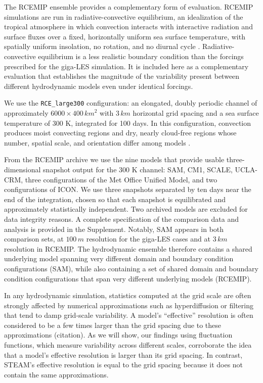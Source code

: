 \documentclass[acp, manuscript, english]{copernicus}
\begin{document}
The RCEMIP ensemble provides a complementary form of evaluation. RCEMIP simulations are run in radiative-convective equilibrium, an idealization of the tropical atmosphere in which convection interacts with interactive radiation and surface fluxes over a fixed, horizontally uniform sea surface temperature, with spatially uniform insolation, no rotation, and no diurnal cycle \citep{wing2018}. Radiative-convective equilibrium is a less realistic boundary condition than the forcings prescribed for the giga-LES simulation. It is included here as a complementary evaluation that establishes the magnitude of the variability present between different hydrodynamic models even under identical forcings. 

We use the \texttt{RCE\_large300} configuration: an elongated, doubly periodic channel of approximately $6000\times400\,\unit{km}^2$ with $3\,\unit{km}$ horizontal grid spacing and a sea surface temperature of 300 K, integrated for 100 days. In this configuration, convection produces moist convecting regions and dry, nearly cloud-free regions whose number, spatial scale, and orientation differ among models \citep{wing2020}. 

From the RCEMIP archive we use the nine models that provide usable three-dimensional snapshot output for the 300 K channel: SAM, CM1, SCALE, UCLA-CRM, three configurations of the Met Office Unified Model, and two configurations of ICON. We use three snapshots separated by ten days near the end of the integration, chosen so that each snapshot is equilibrated and approximately statistically independent. Two archived models are excluded for data integrity reasons. A complete specification of the comparison data and analysis is provided in the Supplement.
Notably, SAM appears in both comparison sets, at $100\,\unit{m}$ resolution for the giga-LES cases and at $3\,\unit{km}$ resolution in RCEMIP. The hydrodynamic ensemble therefore contains a shared underlying model spanning very different domain and boundary condition configurations (SAM), while also containing a set of shared domain and boundary condition configurations that span very different underlying models (RCEMIP).

In any hydrodynamic simulation, statistics computed at the grid scale are often strongly affected by numerical approximations such as hyperdiffusion or filtering that tend to damp grid-scale variability. A model's ``effective'' resolution is often considered to be a few times larger than the grid spacing due to these approximations (citation). As we will show, our findings using fluctuation functions, which measure variability across different scales, corroborate the idea that a model's effective resolution is larger than its grid spacing. In contrast, STEAM's effective resolution is equal to the grid spacing because it does not contain the same approximations.
\end{document}
